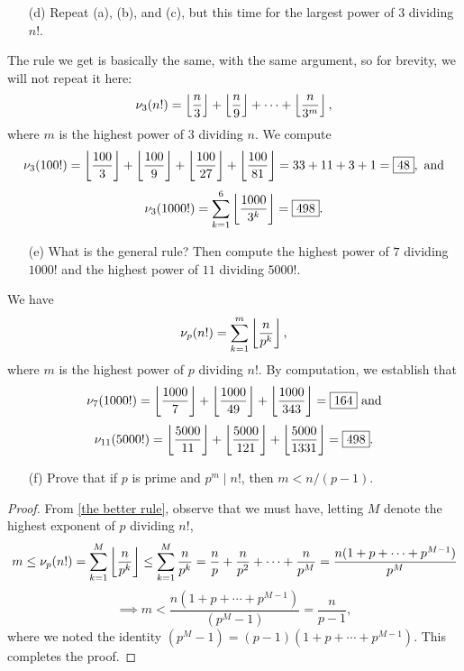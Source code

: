 \documentclass{article}
\begin{document}
\begin{exercise}[Chapter 12, \#5]
\begin{itemize}
    \item[(d)] Repeat (a), (b), and (c), but this time for the largest power of $3$ dividing $n!$.
\end{itemize}
\begin{solution}
The rule we get is basically the same, with the same argument, so for brevity, we will not repeat it here:
$$\nu_3(n!) = \left\lfloor \frac n3\right\rfloor + \left\lfloor \frac n9\right\rfloor + \cdots + \left\lfloor \frac n{3^m}\right\rfloor,$$
where $m$ is the highest power of $3$ dividing $n$. We compute
$$\nu_3(100!) = \left\lfloor \frac{100}3\right\rfloor + \left\lfloor \frac{100}9\right\rfloor + \left\lfloor \frac{100}{27}\right\rfloor + \left\lfloor \frac{100}{81}\right\rfloor=33+11+3+1 = \boxed{48}, \text{ and}$$
$$\nu_3(1000!) = \sum_{k=1}^6 \left\lfloor \frac{1000}{3^k}\right\rfloor = \boxed{498}.$$
\end{solution}

\begin{itemize}
    \item[(e)] What is the general rule? Then compute the highest power of $7$ dividing $1000!$ and the highest power of $11$ dividing $5000!$.
\end{itemize}
\begin{solution}
We have
\begin{equation}\label{the better rule}
\nu_p(n!) = \sum_{k=1}^m \left\lfloor \frac n{p^k}\right\rfloor,
\end{equation}
where $m$ is the highest power of $p$ dividing $n!$. By computation, we establish that
$$\nu_7(1000!) = \left\lfloor \frac{1000}7\right\rfloor + \left\lfloor \frac{1000}{49}\right\rfloor + \left\lfloor \frac{1000}{343}\right\rfloor = \boxed{164} \text{ and}$$
$$\nu_{11}(5000!) = \left\lfloor \frac{5000}{11}\right\rfloor + \left\lfloor \frac{5000}{121}\right\rfloor + \left\lfloor \frac{5000}{1331}\right\rfloor = \boxed{498}.$$
\end{solution}

\begin{itemize}
    \item[(f)] Prove that if $p$ is prime and $p^m \mid n!$, then $m < n/(p-1)$.
\end{itemize}
\begin{proof}
From \eqref{the better rule}, observe that we must have, letting $M$ denote the highest exponent of $p$ dividing $n!$,
$$m \leq \nu_p(n!)= \sum_{k=1}^M \left\lfloor \frac n{p^k}\right\rfloor \leq \sum_{k=1}^M \frac n{p^k} = \frac np + \frac n{p^2} + \cdots + \frac n{p^M} = \frac{n(1 + p + \cdots + p^{M-1})}{p^M}$$
$$\implies m < \frac{n(1+p+\cdots + p^{M-1})}{(p^M-1)} = \frac{n}{p-1},$$
where we noted the identity $(p^M-1) = (p-1)(1 + p + \cdots + p^{M-1})$. This completes the proof.
\end{proof}
\end{exercise}
\end{document}
